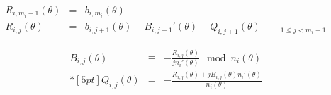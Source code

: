 \begin{comment}
\begin{IEEEeqnarray*}{rClc}
R_{i,m_i-1}(\theta) &=& b_{i,m_i}(\theta) & \IEEEyessubnumber \\*[10pt]
R_{i,j}(\theta) &=& b_{i,j+1}(\theta) - B_{i,j+1}'(\theta) - Q_{i,j+1}(\theta) \qquad{}_{1\le j<m_i-1}&  \IEEEyessubnumber \\
B_{i,j}(\theta) &\equiv& - \frac{R_{i,j}(\theta)}{j n_i'(\theta) } \mod n_i(\theta) &  \IEEEyesnumber \\*[10pt]
Q_{i,j}(\theta) &=& - \frac{R_{i,j}(\theta) + j B_{i,j}(\theta) n_i'(\theta)}{n_i(\theta)} &  \IEEEyesnumber
\end{IEEEeqnarray*}
\end{comment}

\begin{subequations}
\begin{eqnarray}
R_{i,m_i-1}(\theta) &=& b_{i,m_i}(\theta) \\
R_{i,j}(\theta) &=& b_{i,j+1}(\theta) - B_{i,j+1}'(\theta) - Q_{i,j+1}(\theta) \qquad{}_{1\le j<m_i-1}
\end{eqnarray}
\end{subequations}

\begin{eqnarray}
B_{i,j}(\theta) &\equiv& - \frac{R_{i,j}(\theta)}{j n_i'(\theta) } \mod n_i(\theta)  \\*[5pt]
Q_{i,j}(\theta) &=& - \frac{R_{i,j}(\theta) + j B_{i,j}(\theta) n_i'(\theta)}{n_i(\theta)}
\end{eqnarray}

\begin{comment}
\begin{IEEEeqnarray*}{rCl?c}
\IEEEeqnarraymulticol{3}{c}{m_i > 1} & m_i = 1 \\*[10pt]
C_i &=& \frac{b_{i,1}(\theta) - B_{i,1}'(\theta) - Q_{i,1}(\theta)}{n_i'(\theta)} & C_i = \frac{b_{i,1}(\theta)}{n_i'(\theta)} \IEEEyesnumber
\end{IEEEeqnarray*}
\end{comment}

%

\renewcommand{\theequationdis}{{\normalfont (\theequation)}}
\renewcommand{\theIEEEsubequationdis}{{\normalfont (\theIEEEsubequation)}}

